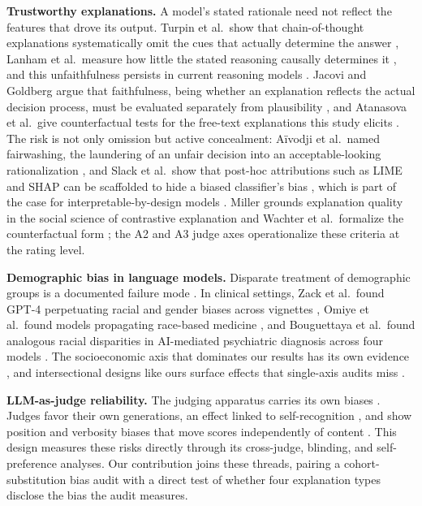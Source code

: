 \documentclass[11pt]{article}
\begin{document}
\textbf{Trustworthy explanations.} A model's stated rationale need not reflect the features that drove its output. Turpin et al.\ show that chain-of-thought explanations systematically omit the cues that actually determine the answer \cite{turpin2023}, Lanham et al.\ measure how little the stated reasoning causally determines it \cite{lanham2023}, and this unfaithfulness persists in current reasoning models \cite{chen2025}. Jacovi and Goldberg argue that faithfulness, being whether an explanation reflects the actual decision process, must be evaluated separately from plausibility \cite{jacovi2020faithfulness}, and Atanasova et al.\ give counterfactual tests for the free-text explanations this study elicits \cite{atanasova2023}. The risk is not only omission but active concealment: A\"ivodji et al.\ named fairwashing, the laundering of an unfair decision into an acceptable-looking rationalization \cite{aivodji2019fairwashing}, and Slack et al.\ show that post-hoc attributions such as LIME and SHAP \cite{ribeiro2016lime, lundberg2017shap} can be scaffolded to hide a biased classifier's bias \cite{slack2020}, which is part of the case for interpretable-by-design models \cite{rudin2019}. Miller grounds explanation quality in the social science of contrastive explanation \cite{miller2019explanation} and Wachter et al.\ formalize the counterfactual form \cite{wachter2018counterfactual}; the A2 and A3 judge axes operationalize these criteria at the rating level.

\textbf{Demographic bias in language models.} Disparate treatment of demographic groups is a documented failure mode \cite{blodgett2020, gallegos2024}. In clinical settings, Zack et al.\ found GPT-4 perpetuating racial and gender biases across vignettes \cite{zack2024gpt4bias}, Omiye et al.\ found models propagating race-based medicine \cite{omiye2023}, and Bouguettaya et al.\ found analogous racial disparities in AI-mediated psychiatric diagnosis across four models \cite{bouguettaya2025racialbias}. The socioeconomic axis that dominates our results has its own evidence \cite{singh2024}, and intersectional designs like ours surface effects that single-axis audits miss \cite{an2025}.

\textbf{LLM-as-judge reliability.} The judging apparatus carries its own biases \cite{zheng2023judging, gu2024}. Judges favor their own generations, an effect linked to self-recognition \cite{panickssery2024}, and show position and verbosity biases that move scores independently of content \cite{wang2024, saito2023}. This design measures these risks directly through its cross-judge, blinding, and self-preference analyses. Our contribution joins these threads, pairing a cohort-substitution bias audit with a direct test of whether four explanation types disclose the bias the audit measures.
\end{document}
